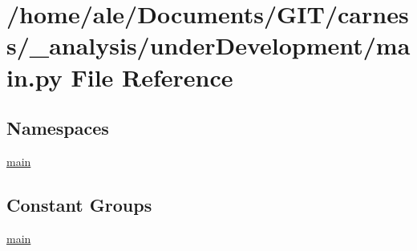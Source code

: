 \hypertarget{a00052}{\section{/home/ale/\-Documents/\-G\-I\-T/carness/\-\_\-analysis/under\-Development/main.py File Reference}
\label{a00052}
}
\subsection*{Namespaces}
\begin{DoxyCompactItemize}
\item 
\hyperlink{a00111}{main}
\end{DoxyCompactItemize}
\subsection*{Constant Groups}
\begin{DoxyCompactItemize}
\item 
\hyperlink{a00111}{main}
\end{DoxyCompactItemize}
